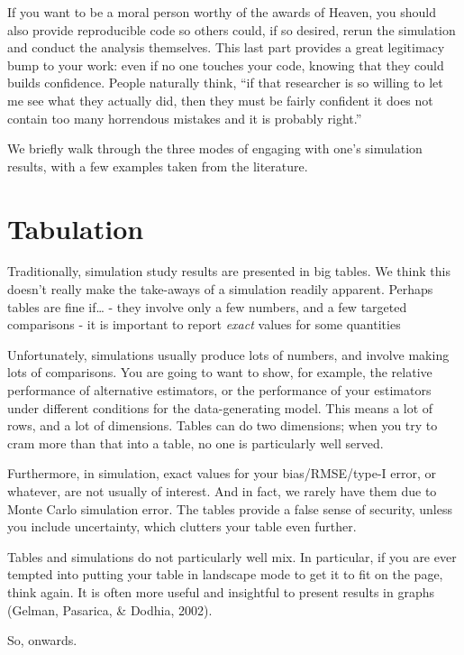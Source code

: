 \documentclass[
]{book}
\begin{document}
If you want to be a moral person worthy of the awards of Heaven, you should also provide reproducible code so others could, if so desired, rerun the simulation and conduct the analysis themselves.
This last part provides a great legitimacy bump to your work: even if no one touches your code, knowing that they could builds confidence.
People naturally think, ``if that researcher is so willing to let me see what they actually did, then they must be fairly confident it does not contain too many horrendous mistakes and it is probably right.''

We briefly walk through the three modes of engaging with one's simulation results, with a few examples taken from the literature.

\hypertarget{tabulation}{%
\section{Tabulation}\label{tabulation}}

Traditionally, simulation study results are presented in big tables.
We think this doesn't really make the take-aways of a simulation readily apparent.
Perhaps tables are fine if\ldots{}
- they involve only a few numbers, and a few targeted comparisons
- it is important to report \emph{exact} values for some quantities

Unfortunately, simulations usually produce lots of numbers, and involve making lots of comparisons.
You are going to want to show, for example, the relative performance of alternative estimators, or the performance of your estimators under different conditions for the data-generating model.
This means a lot of rows, and a lot of dimensions.
Tables can do two dimensions; when you try to cram more than that into a table, no one is particularly well served.

Furthermore, in simulation, exact values for your bias/RMSE/type-I error, or whatever, are not usually of interest. And in fact, we rarely have them due to Monte Carlo simulation error.
The tables provide a false sense of security, unless you include uncertainty, which clutters your table even further.

Tables and simulations do not particularly well mix.
In particular, if you are ever tempted into putting your table in landscape mode to get it to fit on the page, think again.
It is often more useful and insightful to present results in graphs (Gelman, Pasarica, \& Dodhia, 2002).

So, onwards.
\end{document}
